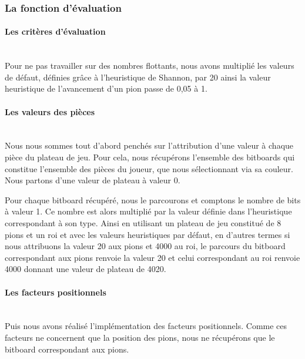 \documentclass{article}
\begin{document}
\subsubsection{La fonction d'évaluation}\label{heuristique_architecture}
\paragraph{Les critères d'évaluation}
~~\\
\newline
Pour ne pas travailler sur des nombres flottants, nous avons multiplié les valeurs de défaut, définies grâce à l'heuristique de Shannon, par 20 ainsi la valeur heuristique de l'avancement d'un pion passe de 0,05 à 1.

\paragraph{Les valeurs des pièces}
~~\\
\newline
Nous nous sommes tout d'abord penchés sur l'attribution d'une valeur à chaque pièce du plateau de jeu. Pour cela, nous récupérons l'ensemble des bitboards qui constitue l'ensemble des pièces du joueur, que nous sélectionnant via sa couleur. Nous partons d'une valeur de plateau à valeur 0.\newline

Pour chaque bitboard récupéré, nous le parcourons et comptons le nombre de bits à valeur 1. Ce nombre est alors multiplié par la valeur définie dans l'heuristique correspondant à son type. Ainsi en utilisant un plateau de jeu constitué de 8 pions et un roi et avec les valeurs heuristiques par défaut, en d'autres termes si nous attribuons la valeur 20 aux pions et 4000 au roi, le parcours du bitboard correspondant aux pions renvoie la valeur 20 et celui correspondant au roi renvoie 4000 donnant une valeur de plateau de 4020.
\newline
\paragraph{Les facteurs positionnels}
~~\\
\newline
Puis nous avons réalisé l'implémentation des facteurs positionnels.\newline 
Comme ces facteurs ne concernent que la position des pions, nous ne récupérons que le bitboard correspondant aux pions.\newline
\end{document}
